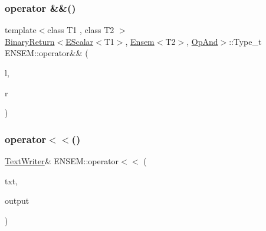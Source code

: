 \mbox{\label{namespaceENSEM_ga327bfc24e647dfce0a0b0373f4e72084}} 
\subsubsection{\texorpdfstring{operator \&\&()}{operator \&\&()}\hspace{0.1cm}{\footnotesize\ttfamily [7/7]}}
{\footnotesize\ttfamily template$<$class T1 , class T2 $>$ \\
\mbox{\hyperlink{structENSEM_1_1BinaryReturn}{Binary\+Return}}$<$\mbox{\hyperlink{classENSEM_1_1EScalar}{E\+Scalar}}$<$T1$>$, \mbox{\hyperlink{classENSEM_1_1Ensem}{Ensem}}$<$T2$>$, \mbox{\hyperlink{structENSEM_1_1OpAnd}{Op\+And}}$>$\+::Type\+\_\+t E\+N\+S\+E\+M\+::operator\&\& (\begin{DoxyParamCaption}\item[{const \mbox{\hyperlink{classENSEM_1_1EScalar}{E\+Scalar}}$<$ T1 $>$ \&}]{l,  }\item[{const \mbox{\hyperlink{classENSEM_1_1Ensem}{Ensem}}$<$ T2 $>$ \&}]{r }\end{DoxyParamCaption})\hspace{0.3cm}{\ttfamily [inline]}}

\mbox{\label{namespaceENSEM_a970df8d2e87b8fc9353c4bb5df94b5c6}} 
\subsubsection{\texorpdfstring{operator$<$$<$()}{operator<<()}\hspace{0.1cm}{\footnotesize\ttfamily [1/8]}}
{\footnotesize\ttfamily \mbox{\hyperlink{classENSEM_1_1TextWriter}{Text\+Writer}}\& E\+N\+S\+E\+M\+::operator$<$$<$ (\begin{DoxyParamCaption}\item[{\mbox{\hyperlink{classENSEM_1_1TextWriter}{Text\+Writer}} \&}]{txt,  }\item[{const string \&}]{output }\end{DoxyParamCaption})}

